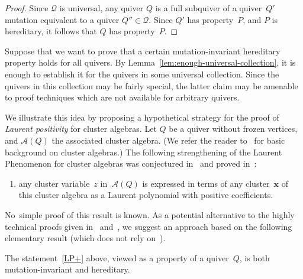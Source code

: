 \begin{proof}
Since $\mathcal{Q}$ is universal, 
any quiver $Q$ is a full subquiver of a quiver~$Q'$ 
mutation equivalent to a quiver $Q''\in\mathcal{Q}$. 
Since $Q'$ has property~$P$, and $P$ is hereditary, it follows that $Q$ has property~$P$. 
\end{proof}
 
Suppose that we want to prove that a certain mutation-invariant hereditary property holds for all quivers. By Lemma~\ref{lem:enough-universal-collection}, it is enough to establish it for the quivers in some universal collection. 
Since the quivers in this collection may be fairly special, the latter claim may be amenable to proof techniques which are not available for arbitrary quivers. 


We illustrate this idea by proposing a hypothetical strategy for the proof of \emph{Laurent positivity} for cluster algebras. 
Let $Q$ be a quiver without frozen vertices, and $\mathcal{A}(Q)$ the associated cluster algebra. (We refer the reader to~\cite{FWZ} for basic background on cluster algebras.) 
The following strengthening of the Laurent Phenomenon for cluster algebras 
was conjectured in~\cite{ca1} and proved in~\cite{GHKK,lee-schiffler}: 
\begin{enumerate}[label=(LP+)]
\item\label{LP+} %
any cluster variable~$z$ in~$\mathcal{A}(Q)$ is expressed in terms of any cluster~$\mathbf{x}$ of this cluster algebra as a Laurent polynomial with positive coefficients. 
\end{enumerate}
No~simple proof of this result is known. As a potential alternative to the highly technical proofs given in~\cite{GHKK} and~\cite{lee-schiffler}, we suggest an approach based on the following elementary result (which does not rely on~\cite{GHKK,lee-schiffler}). 

\begin{lemma}
\label{lem:laurent-positivity-is-hereditary}
The statement~\ref{LP+} above, viewed as a property of a quiver~$Q$, is both mutation-invariant and hereditary. 
\end{lemma}

